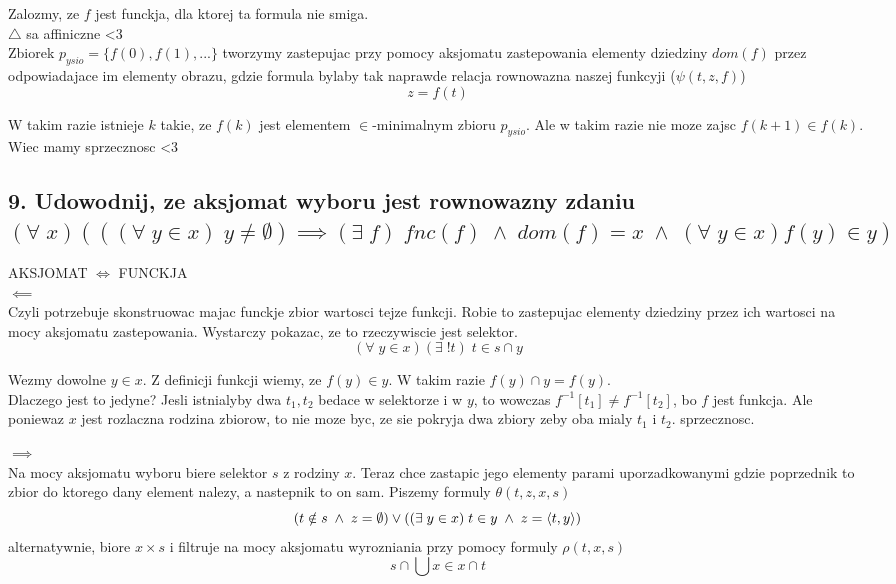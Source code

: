 \documentclass{article}
\begin{document}
Zalozmy, ze $f$ jest funckja, dla ktorej ta formula nie smiga.\smallskip\\

$\triangle$ sa affiniczne <3 \bigskip\\

Zbiorek $p_{ysio}=\{f(0), f(1), ...\}$ tworzymy zastepujac przy pomocy aksjomatu zastepowania elementy dziedziny $dom(f)$ przez odpowiadajace im elementy obrazu, gdzie formula bylaby tak naprawde relacja rownowazna naszej funkcyji ($\psi(t, z, f)$)
$$z=f(t)$$

W takim razie istnieje $k$ takie, ze $f(k)$ jest elementem $\in$-minimalnym zbioru $p_{ysio}$. Ale w takim razie nie moze zajsc $f(k+1)\in f(k)$. Wiec mamy sprzecznosc <3

\subsection*{9. Udowodnij, ze aksjomat wyboru jest rownowazny zdaniu\\
$(\forall\;x)(((\forall\;y\in x)\;y\neq\emptyset)\implies (\exists\;f)\;fnc(f)\;\land\;dom(f)=x\;\land\;(\forall\;y\in x)f(y)\in y)$}

AKSJOMAT $\iff$ FUNCKJA\medskip\\
$\impliedby$\smallskip\\
Czyli potrzebuje skonstruowac majac funckje zbior wartosci tejze funkcji. Robie to zastepujac elementy dziedziny przez ich wartosci na mocy aksjomatu zastepowania. Wystarczy pokazac, ze to rzeczywiscie jest selektor. 
$$(\forall\;y\in x)(\exists\;!t)\;t\in s\cap y$$

Wezmy dowolne $y\in x$. Z definicji funkcji wiemy, ze $f(y)\in y$. W takim razie $f(y)\cap y = f(y)$. \smallskip\\
Dlaczego jest to jedyne? Jesli istnialyby dwa $t_1, t_2$ bedace w selektorze i w $y$, to wowczas $f^{-1}[t_1]\neq f^{-1}[t_2]$, bo $f$ jest funkcja. Ale poniewaz $x$ jest rozlaczna rodzina zbiorow, to nie moze byc, ze sie pokryja dwa zbiory zeby oba mialy $t_1$ i $t_2$. sprzecznosc.\medskip

$\implies$\smallskip\\
Na mocy aksjomatu wyboru biere selektor $s$ z rodziny $x$. Teraz chce zastapic jego elementy parami uporzadkowanymi gdzie poprzednik to zbior do ktorego dany element nalezy, a nastepnik to on sam. Piszemy formuly $\theta(t, z, x, s)$
$$(t\notin s\; \land \;z=\emptyset)\lor((\exists\;y\in x) \;t\in y\;\land\;z=\langle t, y\rangle)$$
alternatywnie, biore $x\times s$ i filtruje na mocy aksjomatu wyrozniania przy pomocy formuly $\rho(t, x, s)$
$$s\cap\bigcup x \in x\cap t$$
\kondow
\end{document}
